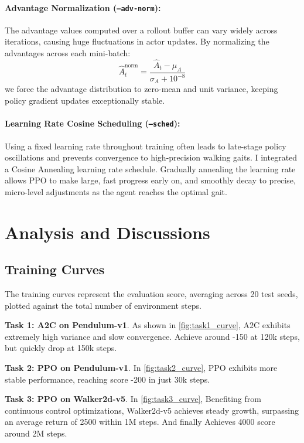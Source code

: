 \documentclass[10pt,twocolumn,letterpaper]{article}
\begin{document}
\paragraph{Advantage Normalization (\texttt{--adv-norm}):}
The advantage values computed over a rollout buffer can vary widely across
iterations, causing huge fluctuations in actor updates. By normalizing the
advantages across each mini-batch:
\begin{equation}
  \hat{A}_t^{\text{norm}} = \frac{\hat{A}_t - \mu_A}{\sigma_A + 10^{-8}}
  \label{eq:adv_norm}
\end{equation}
we force the advantage distribution to zero-mean and unit variance, keeping
policy gradient updates exceptionally stable.

\paragraph{Learning Rate Cosine Scheduling (\texttt{--sched}):}
Using a fixed learning rate throughout training often leads to late-stage
policy oscillations and prevents convergence to high-precision walking gaits.
I integrated a Cosine Annealing learning rate schedule. Gradually annealing
the learning rate allows PPO to make large, fast progress early on, and
smoothly decay to precise, micro-level adjustments as the agent reaches
the optimal gait.

\section{Analysis and Discussions}
\label{sec:analysis}

\subsection{Training Curves}
\label{subsec:analysis_curves}

The training curves represent the evaluation score, averaging across 20
test seeds, plotted against the total number of environment steps.

\textbf{Task 1: A2C on Pendulum-v1}. As shown in \cref{fig:task1_curve},
A2C exhibits extremely high variance and slow convergence. Achieve around
-150 at 120k steps, but quickly drop at 150k steps.

\textbf{Task 2: PPO on Pendulum-v1}. In \cref{fig:task2_curve}, PPO
exhibits more stable performance, reaching score -200 in just 30k steps.

\textbf{Task 3: PPO on Walker2d-v5}. In \cref{fig:task3_curve}, Benefiting
from continuous control optimizations,
Walker2d-v5 achieves steady growth, surpassing an average return of 2500
within 1M steps. And finally Achieves 4000 score around 2M steps.
\end{document}
